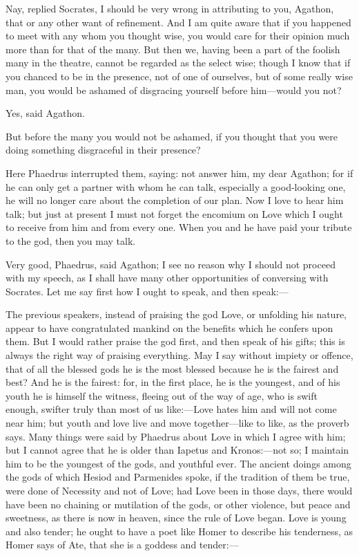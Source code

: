 \documentclass[11pt,letter]{article}
\begin{document}
\par  Nay, replied Socrates, I should be very wrong in attributing to you, Agathon, that or any other want of refinement. And I am quite aware that if you happened to meet with any whom you thought wise, you would care for their opinion much more than for that of the many. But then we, having been a part of the foolish many in the theatre, cannot be regarded as the select wise; though I know that if you chanced to be in the presence, not of one of ourselves, but of some really wise man, you would be ashamed of disgracing yourself before him—would you not?

\par  Yes, said Agathon.

\par  But before the many you would not be ashamed, if you thought that you were doing something disgraceful in their presence?

\par  Here Phaedrus interrupted them, saying: not answer him, my dear Agathon; for if he can only get a partner with whom he can talk, especially a good-looking one, he will no longer care about the completion of our plan. Now I love to hear him talk; but just at present I must not forget the encomium on Love which I ought to receive from him and from every one. When you and he have paid your tribute to the god, then you may talk.

\par  Very good, Phaedrus, said Agathon; I see no reason why I should not proceed with my speech, as I shall have many other opportunities of conversing with Socrates. Let me say first how I ought to speak, and then speak:—

\par  The previous speakers, instead of praising the god Love, or unfolding his nature, appear to have congratulated mankind on the benefits which he confers upon them. But I would rather praise the god first, and then speak of his gifts; this is always the right way of praising everything. May I say without impiety or offence, that of all the blessed gods he is the most blessed because he is the fairest and best? And he is the fairest: for, in the first place, he is the youngest, and of his youth he is himself the witness, fleeing out of the way of age, who is swift enough, swifter truly than most of us like:—Love hates him and will not come near him; but youth and love live and move together—like to like, as the proverb says. Many things were said by Phaedrus about Love in which I agree with him; but I cannot agree that he is older than Iapetus and Kronos:—not so; I maintain him to be the youngest of the gods, and youthful ever. The ancient doings among the gods of which Hesiod and Parmenides spoke, if the tradition of them be true, were done of Necessity and not of Love; had Love been in those days, there would have been no chaining or mutilation of the gods, or other violence, but peace and sweetness, as there is now in heaven, since the rule of Love began. Love is young and also tender; he ought to have a poet like Homer to describe his tenderness, as Homer says of Ate, that she is a goddess and tender:—
\end{document}
